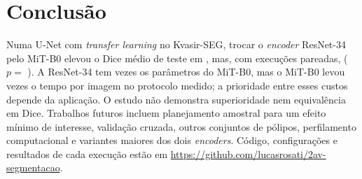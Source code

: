 \documentclass[conference]{IEEEtran}
\begin{document}
\section{Conclusão}

Numa U-Net com \textit{transfer learning} no Kvasir-SEG, trocar o \textit{encoder} ResNet-34 pelo
MiT-B0 elevou o Dice médio de teste em \DiceDiff{}, mas, com \NPairs{} execuções pareadas,
\DiceDecision{} ($p = $ \DiceTP{}). A ResNet-34 tem \ParamsRatio{} vezes os parâmetros do
MiT-B0, mas o MiT-B0 levou \LatRatio{} vezes o tempo por imagem no protocolo medido; a
prioridade entre esses custos depende da aplicação.
O estudo não demonstra superioridade nem equivalência em Dice. Trabalhos futuros incluem
planejamento amostral para um efeito mínimo de interesse, validação cruzada, outros conjuntos
de pólipos, perfilamento computacional e variantes maiores dos dois \textit{encoders}. Código,
configurações e resultados de cada execução estão em
\url{https://github.com/lucasrosati/2av-segmentacao}.



\end{document}
